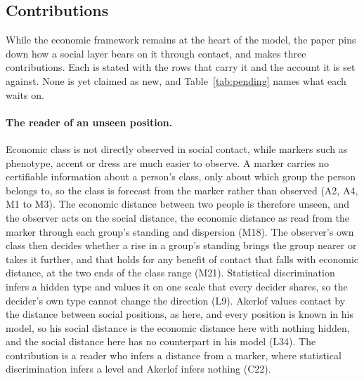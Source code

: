 \subsection{Contributions}

While the economic framework remains at the heart of the model, the paper
pins down how a social layer bears on it through contact, and makes three
contributions. Each is stated with the rows that carry it and the account
it is set against. None is yet claimed as new, and
Table~\ref{tab:pending} names what each waits on.

\paragraph{The reader of an unseen position.} Economic class is not
directly observed in social contact, while markers such as phenotype,
accent or dress are much easier to observe. A marker carries no
certifiable information about a person's class, only about which group the
person belongs to, so the class is forecast from the marker rather than
observed (A2, A4, M1 to M3). The economic distance between two people is
therefore unseen, and the observer acts on the social distance, the
economic distance as read from the marker through each group's standing
and dispersion (M18). The observer's own class then decides whether a rise
in a group's standing brings the group nearer or takes it further, and that
holds for any benefit of contact that falls with economic distance, at the
two ends of the class range (M21). Statistical discrimination infers a
hidden type and values it on one scale that every decider shares, so the
decider's own type cannot change the direction (L9). Akerlof values contact
by the distance between social positions, as here, and every position is
known in his model, so his social distance is the economic distance here
with nothing hidden, and the social distance here has no counterpart in his
model (L34). The contribution is a reader who infers a distance from a
marker, where statistical discrimination infers a level and Akerlof infers
nothing (C22).

